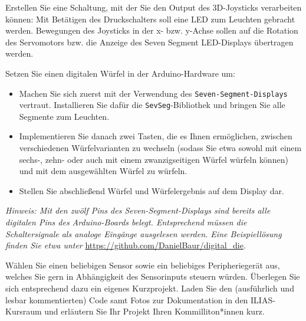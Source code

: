 \documentclass[12pt]{article}
\begin{document}
Erstellen Sie eine Schaltung, mit der Sie den Output des 3D-Joysticks verarbeiten können: Mit Betätigen des Druckschalters soll eine LED zum Leuchten gebracht werden. Bewegungen des Joysticks in der x- bzw. y-Achse sollen auf die Rotation des Servomotors bzw. die Anzeige des Seven Segment LED-Displays übertragen werden.







Setzen Sie einen digitalen Würfel in der Arduino-Hardware um: 
\begin{itemize}
    \item Machen Sie sich zuerst mit der Verwendung des \texttt{Seven-Segment-Displays} vertraut. Installieren Sie dafür die \texttt{SevSeg}-Bibliothek und bringen Sie alle Segmente zum Leuchten.
    \item Implementieren Sie danach zwei Tasten, die es Ihnen ermöglichen, zwischen verschiedenen Würfelvarianten zu wechseln (sodass Sie etwa sowohl mit einem sechs-, zehn- oder auch mit einem zwanzigseitigen Würfel würfeln können) und mit dem ausgewählten Würfel zu würfeln.
    \item Stellen Sie abschließend Würfel und Würfelergebnis auf dem Display dar.
\end{itemize}
\textit{Hinweis: Mit den zwölf Pins des Seven-Segment-Displays sind bereits alle digitalen Pins des Arduino-Boards belegt. Entsprechend müssen die Schaltersignale als analoge Eingänge ausgelesen werden. Eine Beispiellösung finden Sie etwa unter}
\url{https://github.com/DanielBaur/digital_die}.








Wählen Sie einen beliebigen Sensor sowie ein beliebiges Peripheriegerät aus, welches Sie gern in Abhängigkeit des Sensorinputs steuern würden. Überlegen Sie sich entsprechend dazu ein eigenes Kurzprojekt. Laden Sie den (ausführlich und lesbar kommentierten) Code samt Fotos zur Dokumentation in den ILIAS-Kursraum und erläutern Sie Ihr Projekt Ihren Kommilliton*innen kurz.
\end{document}
